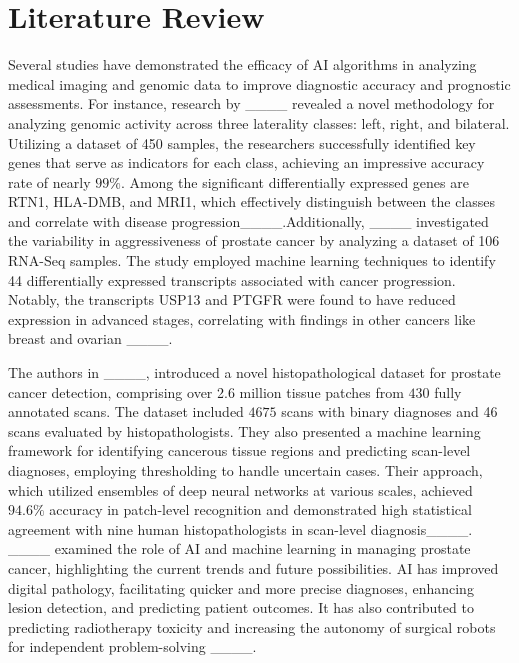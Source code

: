 \section{Literature Review}
Several studies have demonstrated the efficacy of AI algorithms in analyzing medical imaging and genomic data to improve diagnostic accuracy and prognostic assessments. For instance, research by ____ revealed a novel methodology for analyzing genomic activity across three laterality classes: left, right, and bilateral. Utilizing a dataset of 450 samples, the researchers successfully identified key genes that serve as indicators for each class, achieving an impressive accuracy rate of nearly $99\%$. Among the significant differentially expressed genes are RTN1, HLA-DMB, and MRI1, which effectively distinguish between the classes and correlate with disease progression____.Additionally, ____ investigated the variability in aggressiveness of prostate cancer by analyzing a dataset of 106 RNA-Seq samples. The study employed machine learning techniques to identify 44 differentially expressed transcripts associated with cancer progression. Notably, the transcripts USP13 and PTGFR were found to have reduced expression in advanced stages, correlating with findings in other cancers like breast and ovarian ____.

The authors in ____, introduced a novel histopathological dataset for prostate cancer detection, comprising over 2.6 million tissue patches from $430$ fully annotated scans. The dataset included $4675$ scans with binary diagnoses and 46 scans evaluated by histopathologists. They also presented a machine learning framework for identifying cancerous tissue regions and predicting scan-level diagnoses, employing thresholding to handle uncertain cases. Their approach, which utilized ensembles of deep neural networks at various scales, achieved $94.6\%$ accuracy in patch-level recognition and demonstrated high statistical agreement with nine human histopathologists in scan-level diagnosis____.
____ examined the role of AI and machine learning in managing prostate cancer, highlighting the current trends and future possibilities. AI has improved digital pathology, facilitating quicker and more precise diagnoses, enhancing lesion detection, and predicting patient outcomes. It has also contributed to predicting radiotherapy toxicity and increasing the autonomy of surgical robots for independent problem-solving ____. 


